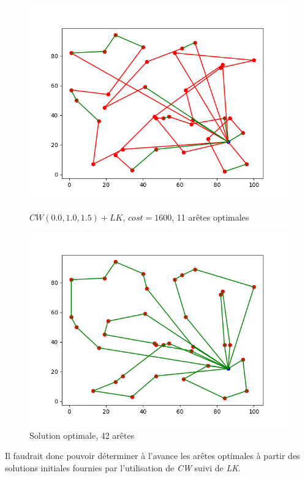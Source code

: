 \documentclass[a4paper,11pt]{article}%
\begin{document}
\begin{figure}
    \begin{minipage}[c]{.46\linewidth}
        \centering
	\includegraphics[scale=0.4]{edges010101.png}
	\caption{$CW(0.0,1.0,1.5)+LK$, $cost = 1600$, 11 arêtes optimales}
	\label{edges010101}	
    \end{minipage}
    \hfill%
    \begin{minipage}[c]{.46\linewidth}
        \centering
	\includegraphics[scale=0.4]{edgesSol.png}
	\caption{Solution optimale, 42 arêtes}
	\label{edgesSol}
    \end{minipage}
\end{figure}

Il faudrait donc pouvoir déterminer à l'avance les arêtes optimales à partir des solutions initiales fournies par l'utilisation de \emph{CW} suivi de \emph{LK}.
\end{document}
